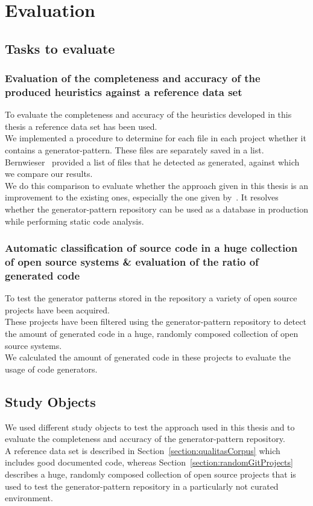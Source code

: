 
\chapter{Evaluation}\label{chapter:evaluation}
\section{Tasks to evaluate}

\subsection{Evaluation of the completeness and accuracy of the produced heuristics against a reference data set}
To evaluate the completeness and accuracy of the heuristics developed in this thesis a reference data set has been used.\\
We implemented a procedure to determine for each file in each project whether it contains a generator-pattern. These files are separately saved in a list. Bernwieser~\cite{Bernwieser2014} provided a list of files that he detected as generated, against which we compare our results. \\
We do this comparison to evaluate whether the approach given in this thesis is an improvement to the existing ones, especially the one given by~\cite{Bernwieser2014}. It resolves whether the generator-pattern repository can be used as a database in production while performing static code analysis.

\subsection{Automatic classification of source code in a huge collection of open source systems \& evaluation of the ratio of generated code}
To test the generator patterns stored in the repository a variety of open source projects have been acquired.\\
These projects have been filtered using the generator-pattern repository to detect the amount of generated code in a huge, randomly composed collection of open source systems.\\
We calculated the amount of generated code in these projects to evaluate the usage of code generators. 

\section{Study Objects}
We used different study objects to test the approach used in this thesis and to evaluate the completeness and accuracy of the generator-pattern repository. \\
A reference data set is described in Section~\ref{section:qualitasCorpus} which includes good documented code, whereas Section~\ref{section:randomGitProjects} describes a huge, randomly composed collection of open source projects that is used to test the generator-pattern repository in a particularly not curated environment.
 
